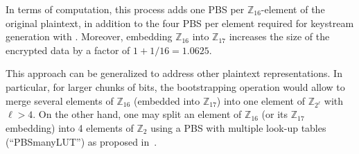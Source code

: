 In terms of computation, this process adds one PBS per $\mathbb{Z}_{16}$-element of the original plaintext, in addition to the four PBS per element required for keystream generation with \coolName. Moreover, embedding $\mathbb{Z}_{16}$ into $\mathbb{Z}_{17}$ increases the size of the encrypted data by a factor of $1 + 1/16 = 1.0625$.

This approach can be generalized to address other plaintext representations. In particular, for larger chunks of bits, the bootstrapping operation would allow to merge several elements of $\mathbb{Z}_{16}$ (embedded into $\mathbb{Z}_{17}$) into one element of $\mathbb{Z}_{2^\ell}$ with $\ell > 4$. On the other hand, one may split an element of $\mathbb{Z}_{16}$ (or its $\mathbb{Z}_{17}$ embedding) into 4 elements of $\mathbb{Z}_{2}$ using a PBS with multiple look-up tables (``PBSmanyLUT'') as proposed in~\cite{AC:CLOT21}.


